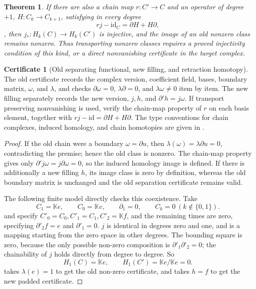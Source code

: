 \documentclass[12pt,a4paper,openany,notitlepage]{report}
\theoremstyle{plain}
\newtheorem{theorem}{Theorem}[chapter]
\theoremstyle{definition}
\newtheorem*{certificate}{Certificate}
\theoremstyle{remark}
\begin{document}
\begin{CJK*}
\begin{theorem}
If there are also a chain map $r:C'\to C$ and an operator of degree $+1$,
$H:C_k\to C_{k+1}$,
satisfying in every degree
\[
 rj-\mathrm{id}_C=\partial H+H\partial,
\],
then $j_*:H_k(C)\to H_k(C')$ is injective, and the image of an old nonzero class remains nonzero. Thus transporting nonzero classes requires a proved injectivity condition of this kind, or a direct nonvanishing certificate in the target complex.
\end{theorem}
\begin{certificate} [Old separating functional, new filling, and retraction homotopy]
The old certificate records the complex version, coefficient field, bases, boundary matrix, $\omega$, and $\lambda$, and checks $\partial\omega=0$, $\lambda\partial=0$, and $\lambda\omega\ne0$ item by item. The new filling separately records the new version, $j,h$, and $\partial'h=j\omega$. If transport preserving nonvanishing is used, verify the chain-map property of $r$ on each basis element, together with $rj-\mathrm{id}=\partial H+H\partial$. The type conventions for chain complexes, induced homology, and chain homotopies are given in \cite{ExtHatcher,ExtWeibel,S38}.
\end{certificate}
\begin{proof}
If the old chain were a boundary $\omega=\partial u$, then $\lambda(\omega)=\lambda\partial u=0$, contradicting the premise; hence the old class is nonzero. The chain-map property gives only $\partial'j\omega=j\partial\omega=0$, so the induced homology image is defined. If there is additionally a new filling $h$, its image class is zero by definition, whereas the old boundary matrix is unchanged and the old separation certificate remains valid.

The following finite model directly checks this coexistence. Take \[
 C_1=\mathbb K e,\qquad C_0=\mathbb K v,
 \qquad\partial_1=0,
 \qquad C_k=0\ (k\notin\{0,1\}).
\] and specify $C'_0=C_0,C'_1=C_1,C'_2=\mathbb K f$, and the remaining times are zero, specifying $\partial'_2f=e$ and $\partial'_1=0$. $j$ is identical in degrees zero and one, and is a mapping starting from the zero space in other degrees. The bounding square is zero, because the only possible non-zero composition is $\partial'_1\partial'_2=0$; the chainability of $j$ holds directly from degree to degree. So \[
 H_1(C)=\mathbb K e,\qquad
 H_1(C')=\mathbb K e/\mathbb K e=0.
\] takes $\lambda(e)=1$ to get the old non-zero certificate, and takes $h=f$ to get the new padded certificate.


\end{proof}
\end{CJK*}
\end{document}
